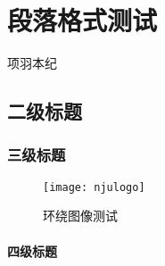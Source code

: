 \documentclass[
    TitleLength=1,%
]{njuthesis}
\begin{document}
\chapter{段落格式测试}
项羽本纪
\section{二级标题}
\zhlipsum[1][name=xiangyu]
\subsection{三级标题}
\begin{wrapfigure}{r}{0cm}
    \texttt{[image: njulogo]}
    \caption{环绕图像测试}
\end{wrapfigure}
\zhlipsum[2][name=xiangyu]
\subsubsection{四级标题}
\zhlipsum[3][name=xiangyu]

\printbibliography
\end{document}
